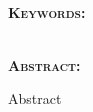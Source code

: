 % 
% 
% 

\newpage

\clearpage
\cleardoublepage
{}

\pagestyle{plain}

{}

{\noindent \large \textbf{\thesisTitle}}\\

{\noindent \textbf{\textsc{Keywords:}}}

{\noindent \thesisKeywords}\\


{\noindent \textbf{\textsc{Abstract:}}}

\noindent Abstract